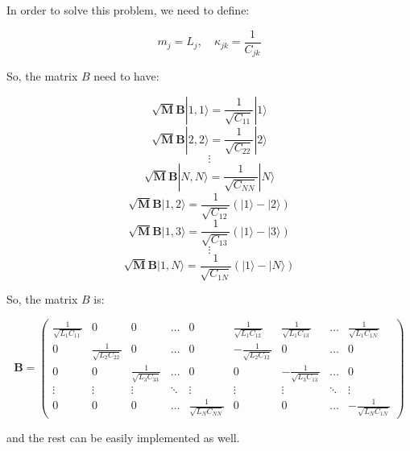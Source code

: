 \documentclass{article}
\begin{document}
In order to solve this problem, we need to define:

$$m_j = L_j, \quad \kappa_{jk} = \frac{1}{C_{jk}}$$

So, the matrix $B$ need to have:

$$\sqrt{\textbf{M}}\textbf{B}|1,1\rangle = \frac{1}{\sqrt{C_{11}}}|1\rangle$$
$$\sqrt{\textbf{M}}\textbf{B}|2,2\rangle = \frac{1}{\sqrt{C_{22}}}|2\rangle$$
$$\vdots$$
$$\sqrt{\textbf{M}}\textbf{B}|N,N\rangle = \frac{1}{\sqrt{C_{NN}}}|N\rangle$$
$$\sqrt{\textbf{M}}\textbf{B}|1,2\rangle = \frac{1}{\sqrt{C_{12}}}(|1\rangle - |2\rangle)$$
$$\sqrt{\textbf{M}}\textbf{B}|1,3\rangle = \frac{1}{\sqrt{C_{13}}}(|1\rangle - |3\rangle)$$
$$\vdots$$
$$\sqrt{\textbf{M}}\textbf{B}|1,N\rangle = \frac{1}{\sqrt{C_{1N}}}(|1\rangle - |N\rangle)$$

So, the matrix $B$ is:

$$\textbf{B} = \begin{pmatrix}
    \frac{1}{\sqrt{L_1C_{11}}} & 0 & 0 & \dots & 0 & \frac{1}{\sqrt{L_1C_{12}}} & \frac{1}{\sqrt{L_1C_{13}}} & \dots & \frac{1}{\sqrt{L_1C_{1N}}} \\
    0 & \frac{1}{\sqrt{L_2C_{22}}} & 0 & \dots & 0 & -\frac{1}{\sqrt{L_2C_{12}}} & 0 & \dots & 0 \\
    0 & 0 & \frac{1}{\sqrt{L_3C_{33}}} & \dots & 0 & 0 & -\frac{1}{\sqrt{L_3C_{13}}} & \dots & 0 \\
    \vdots & \vdots & \vdots & \ddots & \vdots & \vdots & \vdots & \ddots & \vdots \\
    0 & 0 & 0 & \dots & \frac{1}{\sqrt{L_N C_{NN}}} & 0 & 0 & \dots & -\frac{1}{\sqrt{L_N C_{1N}}}
\end{pmatrix}$$

and the rest can be easily implemented as well.
\end{document}
